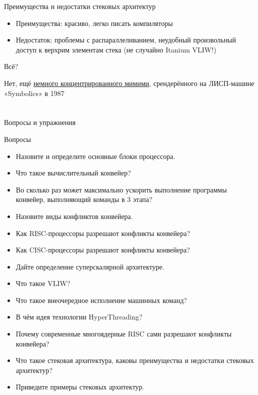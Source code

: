 \documentclass[xetex,aspectratio=43]{beamer}
\begin{document}
\begin{frame}{Преимущества и недостатки стековых архитектур}
    \begin{itemize}
        \item Преимущества: красиво, легко писать компиляторы
        \item Недостаток: проблемы с распараллеливанием, неудобный произвольный доступ к верхрим элементам стека (не случайно Itanium VLIW!)
    \end{itemize}

    \pause
    Всё?
    \pause

    Нет, ещё \href{\ytlink{3bTqWsVqyzE}}{немного концентрированного мимими}, срендерённого на ЛИСП-машине «Symbolics» в 1987
\end{frame}

\section*{}

\begin{frame}{Вопросы и упражнения}
\begin{block}{Вопросы}
\begin{itemize}
\tightlist
\item Назовите и определите основные блоки процессора.
\item Что такое вычислительный конвейер?
\item Во сколько раз может максимально ускорить выполнение программы конвейер, выполняющий команды в 3 этапа?
\item Назовите виды конфликтов конвейера.
\item Как RISC-процессоры разрешают конфликты конвейера?
\item Как CISC-процессоры разрешают конфликты конвейера?
\item Дайте определение суперскалярной архитектуре.
\item Что такое VLIW?
\item Что такое внеочередное исполнение машинных команд?
\item В чём идея технологии HyperThreading?
\item Почему современные многоядерные RISC сами разрешают конфликты конвейера?
\item Что такое стековая архитектура, каковы преимущества и недостатки стековых архитектур?
\item Приведите примеры стековых архитектур.
\end{itemize}
\end{block}
\end{frame}

\postamble
\end{document}
